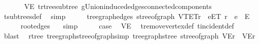 \begin{isabellebody}
\ \ \ \ \isamarkupfalse%
\ {}\ VE{\isacharprime}{\kern0pt}\ t{\isachardot}{\kern0pt}rtree{\isacharunderscore}{\kern0pt}subtree\ g{\isacharprime}{\kern0pt}{\isachardot}{\kern0pt}Union{\isacharunderscore}{\kern0pt}induced{\isacharunderscore}{\kern0pt}edges{\isacharunderscore}{\kern0pt}connected{\isacharunderscore}{\kern0pt}components\isanewline
\ \ \ \ \isamarkupfalse%
\ t{\isachardot}{\kern0pt}subtrees{\isacharunderscore}{\kern0pt}def\ \isamarkupfalse%
\ simp\isanewline
\ \ \isamarkupfalse%
\ \isamarkupfalse%
\ {\isachardoublequoteopen}tree{\isacharunderscore}{\kern0pt}graph{\isacharunderscore}{\kern0pt}edges\ {\isacharparenleft}{\kern0pt}stree{\isacharunderscore}{\kern0pt}of{\isacharunderscore}{\kern0pt}graph\ {\isacharparenleft}{\kern0pt}V\isactrlsub T{\isacharcomma}{\kern0pt}E\isactrlsub T{\isacharcomma}{\kern0pt}r{\isacharparenright}{\kern0pt}{\isacharparenright}{\kern0pt}\ {\isacharequal}{\kern0pt}\ {\isacharbraceleft}{\kern0pt}e{\isasymin}E\isactrlsub T{\isachardot}{\kern0pt}\ r\ {\isasymin}\ e{\isacharbraceright}{\kern0pt}\ {\isasymunion}\ E{\isacharprime}{\kern0pt}{\isachardoublequoteclose}\isanewline
\ \ \ \ \isamarkupfalse%
\ root{\isacharunderscore}{\kern0pt}edges\ {}{\isacharparenleft}{\kern0pt}{}{\isacharparenright}{\kern0pt}\ \isamarkupfalse%
\ simp\isanewline
\ \ \isamarkupfalse%
\ \isamarkupfalse%
\ {\isacharquery}{\kern0pt}case\ \isamarkupfalse%
\ VE{\isacharprime}{\kern0pt}\ \isamarkupfalse%
\ t{\isachardot}{\kern0pt}remove{\isacharunderscore}{\kern0pt}vertex{\isacharunderscore}{\kern0pt}def\ t{\isachardot}{\kern0pt}incident{\isacharunderscore}{\kern0pt}def\ \isamarkupfalse%
\ blast\isanewline
{}\isamarkupfalse%
%
\endisatagproof
{\isafoldproof}%
%
\isadelimproof
\isanewline
%
\endisadelimproof
\isanewline
{}\isamarkupfalse%
\ {\isacharparenleft}{\kern0pt}\ rtree{\isacharparenright}{\kern0pt}\ tree{\isacharunderscore}{\kern0pt}graph{\isacharunderscore}{\kern0pt}stree{\isacharunderscore}{\kern0pt}of{\isacharunderscore}{\kern0pt}graph{\isacharbrackleft}{\kern0pt}simp{\isacharbrackright}{\kern0pt}{\isacharcolon}{\kern0pt}\ {\isachardoublequoteopen}tree{\isacharunderscore}{\kern0pt}graph{\isacharunderscore}{\kern0pt}stree\ {\isacharparenleft}{\kern0pt}stree{\isacharunderscore}{\kern0pt}of{\isacharunderscore}{\kern0pt}graph\ {\isacharparenleft}{\kern0pt}V{\isacharcomma}{\kern0pt}E{\isacharcomma}{\kern0pt}r{\isacharparenright}{\kern0pt}{\isacharparenright}{\kern0pt}\ {\isacharequal}{\kern0pt}\ {\isacharparenleft}{\kern0pt}V{\isacharcomma}{\kern0pt}E{\isacharcomma}{\kern0pt}r{\isacharparenright}{\kern0pt}{\isachardoublequoteclose}\isanewline

\end{isabellebody}
